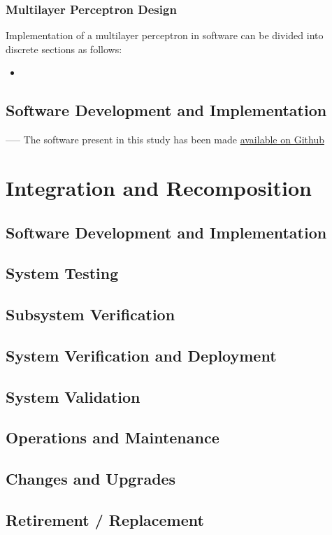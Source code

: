 \subsubsection{Multilayer Perceptron Design}

Implementation of a multilayer perceptron in software can be divided into discrete sections as follows:
\begin{itemize}
	\item
	
	
	
	
\end{itemize}


\subsection{Software Development and Implementation}




-----
The software present in this study has been made \href{http://github.com/roansong}{available on Github}

\section{Integration and Recomposition}
\subsection{Software Development and Implementation}
\subsection{System Testing}
\subsection{Subsystem Verification}
\subsection{System Verification and Deployment}
\subsection{System Validation}
\subsection{Operations and Maintenance}
\subsection{Changes and Upgrades}
\subsection{Retirement / Replacement}












